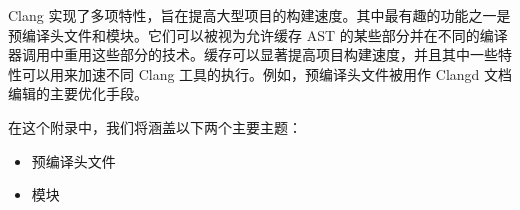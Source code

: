Clang 实现了多项特性，旨在提高大型项目的构建速度。其中最有趣的功能之一是预编译头文件和模块。它们可以被视为允许缓存 AST 的某些部分并在不同的编译器调用中重用这些部分的技术。缓存可以显著提高项目构建速度，并且其中一些特性可以用来加速不同 Clang 工具的执行。例如，预编译头文件被用作 Clangd 文档编辑的主要优化手段。

在这个附录中，我们将涵盖以下两个主要主题：

\begin{itemize}
\item
预编译头文件

\item
模块
\end{itemize}

